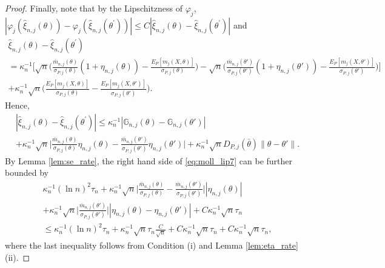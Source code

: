 \documentclass[letterpaper,11pt]{article}
\theoremstyle{myplain}
\theoremstyle{mydefinition}
\theoremstyle{myremark}
\numberwithin{equation}{section}
\numberwithin{figure}{section}
\begin{document}
\begin{appendices}
\begin{proof}
Finally, note that by the Lipschitzness of $\varphi_j$,  $|\varphi_j(\hat{\xi}_{n,j}(\theta))-\varphi_j(\hat{\xi}_{n,j}(\theta^\prime))|\le C|\hat{\xi}_{n,j}(\theta)-\hat{\xi}_{n,j}(\theta^\prime)|$ and
\begin{multline}
\hat{\xi}_{n,j}(\theta)-\hat{\xi}_{n,j}(\theta^\prime)
\\
= \kappa_n^{-1}\Big[\sqrt n\Big(\frac{\bar m_{n,j}(\theta)}{ \sigma_{P,j}(\theta)}(1+\eta_{n,j}(\theta))-\frac{E_P[m_j(X,\theta)]}{ \sigma_{P,j}(\theta)}\Big)-\sqrt n\Big(\frac{\bar m_{n,j}(\theta')}{ \sigma_{P,j}(\theta')}(1+\eta_{n,j}(\theta'))-\frac{E_P[m_j(X,\theta')]}{ \sigma_{P,j}(\theta')}\Big)\Big]\\
+\kappa_n^{-1}\sqrt n\Big(\frac{E_P[m_j(X,\theta)]}{ \sigma_{P,j}(\theta)}-\frac{E_P[m_j(X,\theta')]}{ \sigma_{P,j}(\theta')}\Big).\label{eq:moll_lip6}
\end{multline}
Hence,
\begin{multline}
|\hat{\xi}_{n,j}(\theta)-\hat{\xi}_{n,j}(\theta^\prime)|\le \kappa_n^{-1}|\mathbb G_{n,j}(\theta)-\mathbb G_{n,j}(\theta')|\\
+ \kappa_n^{-1}\sqrt n\Big|\frac{\bar m_{n,j}(\theta)}{ \sigma_{P,j}(\theta)}\eta_{n,j}(\theta)-\frac{\bar m_{n,j}(\theta')}{ \sigma_{P,j}(\theta')}\eta_{n,j}(\theta')\Big|+\kappa_n^{-1}\sqrt n D_{P,j}(\bar\theta)\|\theta-\theta'\|.\label{eq:moll_lip7}
\end{multline}
By Lemma \ref{lem:se_rate}, the right hand side of \eqref{eq:moll_lip7} can be further bounded by
\begin{multline}
\kappa_n^{-1}(\ln n)^2\tau_n+\kappa_n^{-1}\sqrt n\Big|\frac{\bar m_{n,j}(\theta)}{ \sigma_{P,j}(\theta)}-\frac{\bar m_{n,j}(\theta')}{ \sigma_{P,j}(\theta')}\Big||\eta_{n,j}(\theta)|\\
+\kappa_n^{-1}\sqrt n\Big|\frac{\bar m_{n,j}(\theta')}{ \sigma_{P,j}(\theta')}\Big||\eta_{n,j}(\theta)-\eta_{n,j}(\theta')|+C\kappa_n^{-1}\sqrt n\tau_n\\
\le \kappa_n^{-1}(\ln n)^2\tau_n+\kappa_n^{-1}\sqrt n\tau_n \frac{C}{\sqrt n}+C\kappa_n^{-1}\sqrt n\tau_n+C\kappa_n^{-1}\sqrt n\tau_n,\label{eq:moll_lip8}
\end{multline}
where the last inequality follows from Condition (i) and Lemma \ref{lem:eta_rate} (ii).



\end{proof}
\end{appendices}
\end{document}
